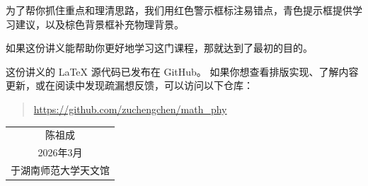 为了帮你抓住重点和理清思路，我们用\textcolor{red!70!black}{红色警示框}标注易错点，\textcolor{hintteal}{青色提示框}提供学习建议，以及\textcolor{physicsbrown}{棕色背景框}补充物理背景。

如果这份讲义能帮助你更好地学习这门课程，那就达到了最初的目的。

这份讲义的 \LaTeX{} 源代码已发布在 GitHub。
如果你想查看排版实现、了解内容更新，或在阅读中发现疏漏想反馈，可以访问以下仓库：

\begin{quote}
\small\url{https://github.com/zuchengchen/math_phy}
\end{quote}
%
%
\vspace{2em}
\begin{flushright}
\begin{tabular}{c}
陈祖成 \\
2026年3月 \\
于湖南师范大学天文馆
\end{tabular}
\end{flushright}
